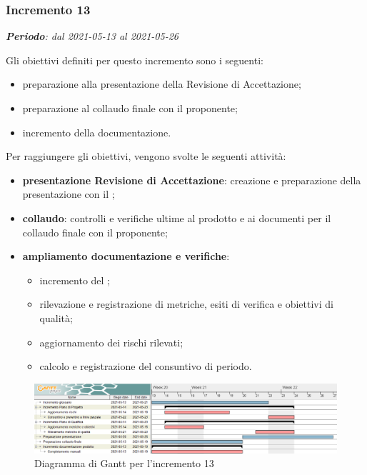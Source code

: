 \subsubsection{Incremento 13}
\textit{\textbf{Periodo}: dal 2021-05-13 al 2021-05-26}

Gli obiettivi definiti per questo incremento sono i seguenti:
\begin{itemize}

\item preparazione alla presentazione della Revisione di Accettazione;
\item preparazione al collaudo finale con il proponente;
\item incremento della documentazione.
\end{itemize}

Per raggiungere gli obiettivi, vengono svolte le seguenti attività:
\begin{itemize}
\item \textbf{presentazione Revisione di Accettazione}: creazione e preparazione della presentazione con il \VT{};
\item \textbf{collaudo}: controlli e verifiche ultime al prodotto e ai documenti per il collaudo finale con il proponente;
\item \textbf{ampliamento documentazione e verifiche}:
\begin{itemize}
\item incremento del ;
\item rilevazione e registrazione di metriche, esiti di verifica e obiettivi di qualità;
\item aggiornamento dei rischi rilevati;
\item calcolo e registrazione del consuntivo di periodo.
\end{itemize}

\end{itemize}
\begin{figure}[H]
\centering

\centerline{\includegraphics[scale=0.6]{res/Pianificazione/Fasi/VerificaIncrementi/ganttIncremento13}}
\caption{Diagramma di Gantt per l'incremento 13}
\end{figure}